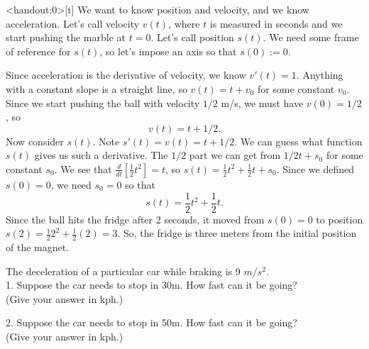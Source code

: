 \begin{frame}<handout:0>[t]
\color{answercolor}
We want to know position and velocity, and we know acceleration. Let's call velocity $v(t)$, where $t$ is measured in seconds and we start pushing the marble at $t=0$. Let's call position $s(t)$. We need some frame of reference for $s(t)$, so let's impose an axis so that $s(0):=0$.

\smallskip
Since acceleration is the derivative of velocity, we know $v'(t)=1$. Anything with a constant slope is a straight line, so $v(t)=t+v_0$ for some constant $v_0$. Since we start pushing the ball with velocity $1/2$ m/s, we must have $v(0)=1/2$, so
\[v(t)=t+1/2.\]
Now consider $s(t)$. Note $s'(t)=v(t)=t+1/2$. We can guess what function $s(t)$ gives us such a derivative. The $1/2$ part we can get from $1/2t+s_0$ for some constant $s_0$. We see that $\frac{d}{dt}[\frac{1}{2}t^2]=t$, so $s(t)=\frac{1}{2}t^2+\frac{1}{2}t+s_0$. Since we defined $s(0)=0$, we need $s_0=0$ so that
\[s(t)=\frac{1}{2}t^2+\frac{1}{2}t.\] 
Since the ball hits the fridge after 2 seconds, it moved from $s(0)=0$ to position $s(2)=\frac{1}{2}2^2+\frac{1}{2}(2)=3$. So, the fridge is three meters from the initial position of the magnet.
\end{frame}
\begin{frame}[t]
\AnswerYes\MoreSpace
The deceleration of a particular car while braking is 9 $m/s^2$.\\
\textcolor{C3}{1. Suppose the car needs to stop in 30m. How fast can it be going?} \\(Give your answer in kph.)

\vfill

\textcolor{C1}{2. Suppose the car needs to stop in 50m. How fast can it be going?}\\ (Give your answer in kph.)

\end{frame}
